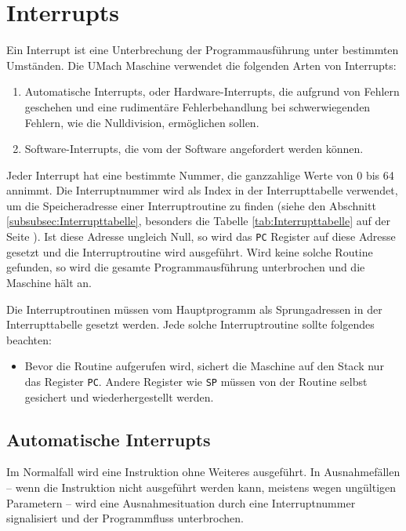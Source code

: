 \section{Interrupts}
\label{sec:Interrupts}

Ein Interrupt ist eine Unterbrechung der Programmausführung unter bestimmten
Umständen. Die UMach Maschine verwendet die folgenden Arten von Interrupts:

\begin{enumerate}
 \item Automatische Interrupts, oder Hardware-Interrupts, die aufgrund von
       Fehlern geschehen und eine rudimentäre Fehlerbehandlung bei
       schwerwiegenden Fehlern, wie die Nulldivision, ermöglichen sollen.
 \item Software-Interrupts, die vom der Software angefordert
       werden können.
\end{enumerate}

Jeder Interrupt hat eine bestimmte Nummer, die ganzzahlige Werte von 0 bis 64
annimmt. Die Interruptnummer wird als Index in der Interrupttabelle
verwendet, um die Speicheradresse einer Interruptroutine zu finden (siehe den
Abschnitt \ref{subsubsec:Interrupttabelle}, besonders die Tabelle
\ref{tab:Interrupttabelle} auf der Seite \pageref{tab:Interrupttabelle}). Ist
diese Adresse ungleich Null, so wird das \texttt{PC} Register auf diese Adresse
gesetzt und die Interruptroutine wird ausgeführt. Wird keine solche Routine
gefunden, so wird die gesamte Programmausführung unterbrochen und die Maschine
hält an.

Die Interruptroutinen müssen vom Hauptprogramm als Sprungadressen in der
Interrupttabelle gesetzt werden. Jede solche Interruptroutine sollte folgendes
beachten:
\begin{itemize}
 \item Bevor die Routine aufgerufen wird, sichert die Maschine auf den Stack
       nur das Register \texttt{PC}. Andere Register wie \texttt{SP} müssen
       von der Routine selbst gesichert und wiederhergestellt werden.
\end{itemize}


\subsection{Automatische Interrupts}

Im Normalfall wird eine Instruktion ohne Weiteres ausgeführt. In Ausnahmefällen
-- wenn die Instruktion nicht ausgeführt werden kann, meistens wegen ungültigen
Parametern -- wird eine Ausnahmesituation durch eine
Interruptnummer signalisiert und der Programmfluss unterbrochen.




